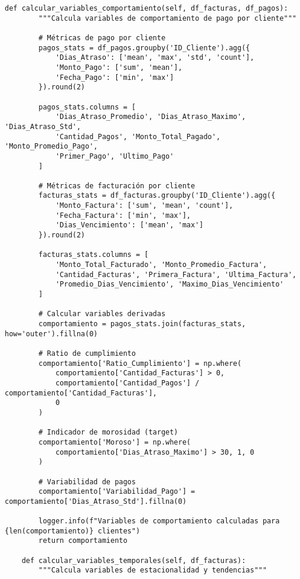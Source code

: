 \begin{verbatim}
def calcular_variables_comportamiento(self, df_facturas, df_pagos):
        """Calcula variables de comportamiento de pago por cliente"""
        
        # Métricas de pago por cliente
        pagos_stats = df_pagos.groupby('ID_Cliente').agg({
            'Dias_Atraso': ['mean', 'max', 'std', 'count'],
            'Monto_Pago': ['sum', 'mean'],
            'Fecha_Pago': ['min', 'max']
        }).round(2)
        
        pagos_stats.columns = [
            'Dias_Atraso_Promedio', 'Dias_Atraso_Maximo', 'Dias_Atraso_Std', 
            'Cantidad_Pagos', 'Monto_Total_Pagado', 'Monto_Promedio_Pago',
            'Primer_Pago', 'Ultimo_Pago'
        ]
        
        # Métricas de facturación por cliente
        facturas_stats = df_facturas.groupby('ID_Cliente').agg({
            'Monto_Factura': ['sum', 'mean', 'count'],
            'Fecha_Factura': ['min', 'max'],
            'Dias_Vencimiento': ['mean', 'max']
        }).round(2)
        
        facturas_stats.columns = [
            'Monto_Total_Facturado', 'Monto_Promedio_Factura', 
            'Cantidad_Facturas', 'Primera_Factura', 'Ultima_Factura',
            'Promedio_Dias_Vencimiento', 'Maximo_Dias_Vencimiento'
        ]
        
        # Calcular variables derivadas
        comportamiento = pagos_stats.join(facturas_stats, how='outer').fillna(0)
        
        # Ratio de cumplimiento
        comportamiento['Ratio_Cumplimiento'] = np.where(
            comportamiento['Cantidad_Facturas'] > 0,
            comportamiento['Cantidad_Pagos'] / comportamiento['Cantidad_Facturas'],
            0
        )
        
        # Indicador de morosidad (target)
        comportamiento['Moroso'] = np.where(
            comportamiento['Dias_Atraso_Maximo'] > 30, 1, 0
        )
        
        # Variabilidad de pagos
        comportamiento['Variabilidad_Pago'] = comportamiento['Dias_Atraso_Std'].fillna(0)
        
        logger.info(f"Variables de comportamiento calculadas para {len(comportamiento)} clientes")
        return comportamiento
    
    def calcular_variables_temporales(self, df_facturas):
        """Calcula variables de estacionalidad y tendencias"""
        

\end{verbatim}
